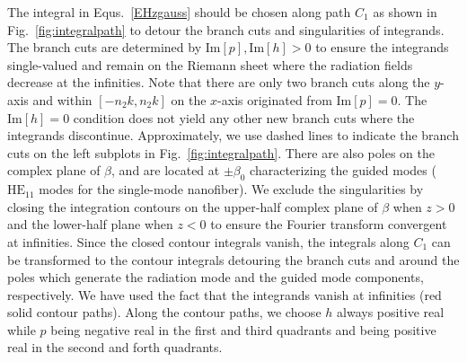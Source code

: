 \documentclass[preprint,aps,pra,onecolumn]{revtex4-1} %
\begin{document}
The integral in Equs.~\eqref{EHzgauss} should be chosen along path $C_1$ as shown in Fig.~\ref{fig:integralpath} to detour the branch cuts and singularities of integrands. The branch cuts are determined by $ \mathrm{Im}[p],\mathrm{Im}[h]>0 $ to ensure the integrands single-valued and remain on the Riemann sheet where the radiation fields decrease at the infinities. Note that there are only two branch cuts along the $ y $-axis and within $ [-n_2k,n_2k] $ on the $ x $-axis originated from $ \mathrm{Im}[p]=0 $. The $ \mathrm{Im}[h]=0 $ condition does not yield any other new branch cuts where the integrands discontinue. Approximately, we use dashed lines to indicate the branch cuts on the left subplots in Fig.~\ref{fig:integralpath}. There are also poles on the complex plane of $ \beta $, and are located at $ \pm\beta_0 $ characterizing the guided modes ($\mathrm{HE}_{11}$ modes for the single-mode nanofiber). We exclude the singularities by closing the integration contours on the upper-half complex plane of $ \beta $ when $ z>0 $ and the lower-half plane when $ z<0 $ to ensure the Fourier transform convergent at infinities. Since the closed contour integrals vanish, the integrals along $ C_1 $ can be transformed to the contour integrals detouring the branch cuts and around the poles which generate the radiation mode and the guided mode components, respectively. We have used the fact that the integrands vanish at infinities (red solid contour paths). Along the contour paths, we choose $ h $ always positive real while $ p $ being negative real in the first and third quadrants and being positive real in the second and forth quadrants. 
\end{document}
